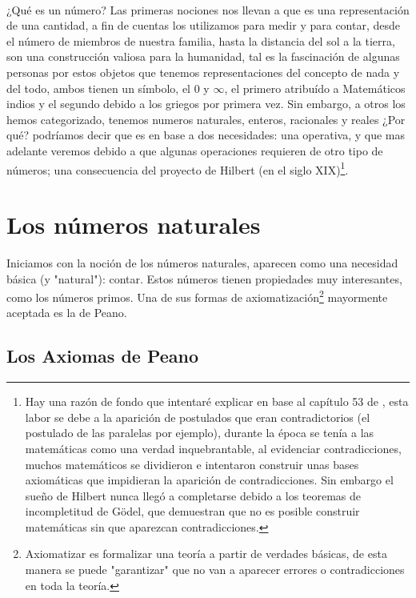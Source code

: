 \documentclass{article}
\begin{document}
\paragraph{} ¿Qué es un número? Las primeras nociones nos llevan a que es una representación de una cantidad, a fin de cuentas los utilizamos para medir y para contar, desde el número de miembros de nuestra familia, hasta la distancia del sol a la tierra, son una construcción valiosa para la humanidad, tal es la fascinación de algunas personas por estos objetos que tenemos representaciones del concepto de nada y del todo, ambos tienen un símbolo, el 0 y $\infty$, el primero atribuído a Matemáticos indios y el segundo debido a los griegos por primera vez. Sin embargo, a otros los hemos categorizado, tenemos numeros naturales, enteros, racionales y reales ¿Por qué? podríamos decir que es en base a dos necesidades: una operativa, y que mas adelante veremos debido a que algunas operaciones requieren de otro tipo de números; una consecuencia del proyecto de Hilbert (en el siglo XIX)\footnote{Hay una razón de fondo que intentaré explicar en base al capítulo 53 de \cite{morris_kline_pensamiento_1972}, esta labor se debe a la aparición de postulados que eran contradictorios (el postulado de las paralelas por ejemplo), durante la época se tenía a las matemáticas como una verdad inquebrantable, al evidenciar contradicciones, muchos matemáticos se dividieron e intentaron construir unas bases axiomáticas que impidieran la aparición de contradicciones. Sin embargo el sueño de Hilbert nunca llegó a completarse debido a los teoremas de incompletitud de Gödel, que demuestran que no es posible construir matemáticas sin que aparezcan contradicciones.
}.

\section{Los números naturales}
Iniciamos con la noción de los números naturales, aparecen como una necesidad básica (y "natural"): contar. Estos números tienen propiedades muy interesantes, como los números primos. Una de sus formas de axiomatización\footnote{Axiomatizar es formalizar una teoría a partir de verdades básicas, de esta manera se puede "garantizar" que no van a aparecer errores o contradicciones en toda la teoría.} mayormente aceptada es la de Peano.

\subsection{Los Axiomas de Peano}
\end{document}
